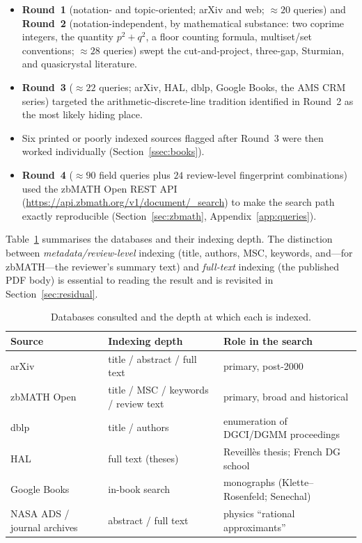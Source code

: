 \documentclass[11pt]{article}
\theoremstyle{plain}
\theoremstyle{remark}
\begin{document}
\begin{itemize}[leftmargin=1.8em,itemsep=3pt]
  \item \textbf{Round~1} (notation- and topic-oriented; arXiv and web;
        $\approx 20$ queries) and \textbf{Round~2} (notation-independent, by
        mathematical substance: two coprime integers, the quantity $p^2+q^2$, a
        floor counting formula, multiset/set conventions; $\approx 28$ queries)
        swept the cut-and-project, three-gap, Sturmian, and quasicrystal literature.
  \item \textbf{Round~3} ($\approx 22$ queries; arXiv, HAL, dblp, Google Books, the
        AMS CRM series) targeted the arithmetic-discrete-line tradition identified in
        Round~2 as the most likely hiding place.
  \item Six printed or poorly indexed sources flagged after Round~3 were then worked
        individually (Section~\ref{ssec:books}).
  \item \textbf{Round~4} ($\approx 90$ field queries plus $24$ review-level
        fingerprint combinations) used the zbMATH Open REST API
        (\url{https://api.zbmath.org/v1/document/_search}) to make the search path
        exactly reproducible (Section~\ref{sec:zbmath}, Appendix~\ref{app:queries}).
\end{itemize}

Table~\ref{tab:sources} summarises the databases and their indexing depth. The
distinction between \emph{metadata/review-level} indexing (title, authors, MSC,
keywords, and---for zbMATH---the reviewer's summary text) and \emph{full-text}
indexing (the published PDF body) is essential to reading the result and is revisited
in Section~\ref{sec:residual}.

\begin{table}[h]
\centering
\small
\begin{tabular}{@{}lll@{}}
\toprule
Source & Indexing depth & Role in the search\\
\midrule
arXiv & title / abstract / full text & primary, post-2000\\
zbMATH Open & title / MSC / keywords / review text & primary, broad and historical\\
dblp & title / authors & enumeration of DGCI/DGMM proceedings\\
HAL & full text (theses) & Reveill\`es thesis; French DG school\\
Google Books & in-book search & monographs (Klette--Rosenfeld; Senechal)\\
NASA ADS / journal archives & abstract / full text & physics ``rational approximants''\\
\bottomrule
\end{tabular}
\caption{Databases consulted and the depth at which each is indexed.}
\label{tab:sources}
\end{table}
\end{document}
